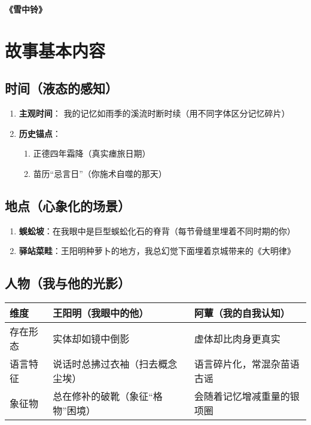 \documentclass{article}
\begin{document}
	\begin{center}
		{\Large{\textbf{\heiti 《雪中铃》}}}
	\end{center}
	
	\section{故事基本内容}
	
	\subsection{时间（液态的感知）}
	
	\begin{enumerate}[noitemsep, label={· }]
		\item \textbf{主观时间}： 我的记忆如雨季的溪流时断时续（用不同字体区分记忆碎片）
		\item \textbf{历史锚点}：
		
		\begin{enumerate}[noitemsep, label={· }]
			\item 正德四年霜降（真实瘗旅日期）
			\item 苗历“忌言日”（你施术自噬的那天）
		\end{enumerate}\textbf{}
		
	\end{enumerate}\textbf{}
	
	\subsection{地点（心象化的场景）}
	
	\begin{enumerate}[noitemsep, label={· }]
		\item \textbf{蜈蚣坡}：在我眼中是巨型蜈蚣化石的脊背（每节骨缝里埋着不同时期的你）
		\item \textbf{驿站菜畦}：王阳明种萝卜的地方，我总幻觉下面埋着京城带来的《大明律》
	\end{enumerate}\textbf{}
	
	\subsection{人物（我与他的光影）}
	
	\begin{table}[!ht]
		\centering
		\begin{tabular}{lll}
			\hline
			维度 & 王阳明（我眼中的他） & 阿蕈（我的自我认知）  \\ \hline
			存在形态 & 实体却如镜中倒影 & 虚体却比肉身更真实  \\ 
			语言特征 & 说话时总拂过衣袖（扫去概念尘埃） & 语言碎片化，常混杂苗语古谣  \\ 
			象征物 & 总在修补的破靴（象征“格物”困境） & 会随着记忆增减重量的银项圈  \\ \hline
		\end{tabular}
	\end{table}
	
\end{document}
